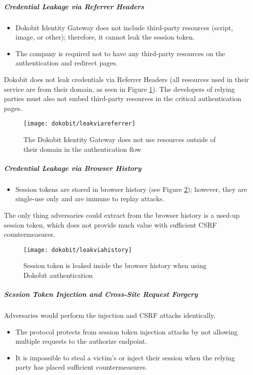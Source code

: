 \subparagraph{Credential Leakage via Referrer Headers}

\begin{itemize}
  \item Dokobit Identity Gateway does not include third-party resources (script, image, or other); therefore, it cannot leak the session token.
  \item The company is required not to have any third-party resources on the authentication and redirect pages.
\end{itemize}

Dokobit does not leak credentials via Referrer Headers (all resources used in their service are from their domain, as seen in Figure \ref{fig:dokobit-leakviareferrer}). The developers of relying parties must also not embed third-party resources in the critical authentication pages.

\begin{figure}
  \centering
  \texttt{[image: dokobit/leakviareferrer]}
  \caption{The Dokobit Identity Gateway does not use resources outside of their domain in the authentication flow}
  \label{fig:dokobit-leakviareferrer}
\end{figure}

\subparagraph{Credential Leakage via Browser History}

\begin{itemize}
  \item Session tokens are stored in browser history (see Figure \ref{fig:dokobit-leakviahistory}); however, they are single-use only and are immune to replay attacks.
\end{itemize}

The only thing adversaries could extract from the browser history is a used-up session token, which does not provide much value with sufficient CSRF countermeasures.

\begin{figure}
  \centering
  \texttt{[image: dokobit/leakviahistory]}
  \caption{Session token is leaked inside the browser history when using Dokobit authentication}
  \label{fig:dokobit-leakviahistory}
\end{figure}

\subparagraph{Session Token Injection and Cross-Site Request Forgery}

Adversaries would perform the injection and CSRF attacks identically.

\begin{itemize}
  \item The protocol protects from session token injection attacks by not allowing multiple requests to the {authorize} endpoint.
  \item It is impossible to steal a victim's or inject their session when the relying party has placed sufficient countermeasures.
\end{itemize}

